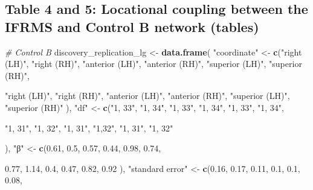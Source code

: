 \documentclass[
]{article}
\newenvironment{Shaded}{\begin{snugshade}}{\end{snugshade}}
\newcommand{\CommentTok}[1]{\textcolor[rgb]{0.56,0.35,0.01}{\textit{#1}}}
\newcommand{\FloatTok}[1]{\textcolor[rgb]{0.00,0.00,0.81}{#1}}
\newcommand{\KeywordTok}[1]{\textcolor[rgb]{0.13,0.29,0.53}{\textbf{#1}}}
\newcommand{\NormalTok}[1]{#1}
\newcommand{\StringTok}[1]{\textcolor[rgb]{0.31,0.60,0.02}{#1}}
\begin{document}
\hypertarget{table-4-and-5-locational-coupling-between-the-ifrms-and-control-b-network-tables}{%
\subsection{Table 4 and 5: Locational coupling between the IFRMS and
Control B network
(tables)}\label{table-4-and-5-locational-coupling-between-the-ifrms-and-control-b-network-tables}}

\begin{Shaded}
\begin{Highlighting}[]
\CommentTok{# Control B}
\NormalTok{discovery_replication_lg <-}\StringTok{ }\KeywordTok{data.frame}\NormalTok{(}
                \StringTok{"coordinate"}\NormalTok{ <-}\StringTok{ }\KeywordTok{c}\NormalTok{(}\StringTok{"right (LH)"}\NormalTok{, }\StringTok{"right (RH)"}\NormalTok{, }\StringTok{"anterior (LH)"}\NormalTok{, }\StringTok{"anterior (RH)"}\NormalTok{, }
                                  \StringTok{"superior (LH)"}\NormalTok{, }\StringTok{"superior (RH)"}\NormalTok{,}
                                  
                                  \StringTok{"right (LH)"}\NormalTok{, }\StringTok{"right (RH)"}\NormalTok{, }\StringTok{"anterior (LH)"}\NormalTok{, }\StringTok{"anterior (RH)"}\NormalTok{, }
                                  \StringTok{"superior (LH)"}\NormalTok{, }\StringTok{"superior (RH)"}
\NormalTok{                                  ),}
                \StringTok{"df"}\NormalTok{ <-}\StringTok{ }\KeywordTok{c}\NormalTok{(}\StringTok{"1, 33"}\NormalTok{, }\StringTok{"1, 34"}\NormalTok{, }\StringTok{"1, 33"}\NormalTok{, }\StringTok{"1, 34"}\NormalTok{, }\StringTok{"1, 33"}\NormalTok{, }\StringTok{"1, 34"}\NormalTok{,}
                          
                          \StringTok{"1, 31"}\NormalTok{, }\StringTok{"1, 32"}\NormalTok{, }\StringTok{"1, 31"}\NormalTok{, }\StringTok{"1,32"}\NormalTok{, }\StringTok{"1, 31"}\NormalTok{, }\StringTok{"1, 32"}
                          
\NormalTok{                          ),}
                \StringTok{"β"}\NormalTok{ <-}\StringTok{ }\KeywordTok{c}\NormalTok{(}\FloatTok{0.61}\NormalTok{, }\FloatTok{0.5}\NormalTok{, }\FloatTok{0.57}\NormalTok{, }\FloatTok{0.44}\NormalTok{, }\FloatTok{0.98}\NormalTok{, }\FloatTok{0.74}\NormalTok{,}
                         
                         \FloatTok{0.77}\NormalTok{, }\FloatTok{1.14}\NormalTok{, }\FloatTok{0.4}\NormalTok{, }\FloatTok{0.47}\NormalTok{, }\FloatTok{0.82}\NormalTok{, }\FloatTok{0.92}
\NormalTok{                         ),}
                \StringTok{"standard error"}\NormalTok{ <-}\StringTok{ }\KeywordTok{c}\NormalTok{(}\FloatTok{0.16}\NormalTok{, }\FloatTok{0.17}\NormalTok{, }\FloatTok{0.11}\NormalTok{, }\FloatTok{0.1}\NormalTok{, }\FloatTok{0.1}\NormalTok{, }\FloatTok{0.08}\NormalTok{,}
                                      

\end{Highlighting}
\end{Shaded}
\end{document}
